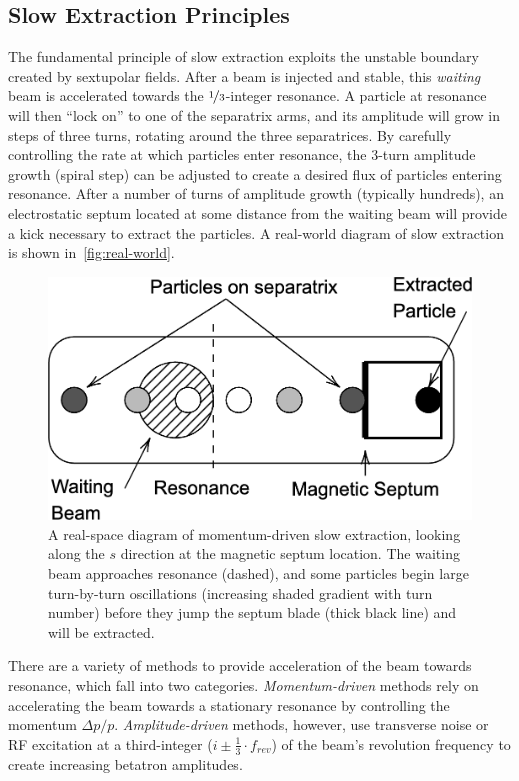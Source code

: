 \documentclass[a4paper,twoside,11pt]{report}
\begin{document}
\subsection{Slow Extraction Principles}
The fundamental principle of slow extraction exploits the unstable boundary created by sextupolar fields. After a beam is injected and stable, this \textit{waiting} beam is accelerated towards the $\nicefrac 13$-integer resonance. A particle at resonance will then ``lock on'' to one of the separatrix arms, and its amplitude will grow in steps of three turns, rotating around the three separatrices. By carefully controlling the rate at which particles enter resonance, the 3-turn amplitude growth (spiral step) can be adjusted to create a desired flux of particles entering resonance. After a number of turns of amplitude growth (typically hundreds), an electrostatic septum located at some distance from the waiting beam will provide a kick necessary to extract the particles. A real-world diagram of slow extraction is shown in~\autoref{fig:real-world}.

\begin{figure}
  \centering
  \includegraphics[width=0.6\linewidth]{real-world.png}
  \caption[Real-space diagram of momentum-driven slow extraction]{A real-space diagram of momentum-driven slow extraction, looking along the $s$ direction at the magnetic septum location. The waiting beam approaches resonance (dashed), and some particles begin large turn-by-turn oscillations (increasing shaded gradient with turn number) before they jump the septum blade (thick black line) and will be extracted.}\label{fig:real-world}
\end{figure}

There are a variety of methods to provide acceleration of the beam towards resonance, which fall into two categories. \textit{Momentum-driven} methods rely on accelerating the beam towards a stationary resonance by controlling the momentum $\Delta p/p$. \textit{Amplitude-driven} methods, however, use transverse noise or RF excitation at a third-integer ($i\pm\frac 13\cdot f_{rev}$) of the beam's revolution frequency to create increasing betatron amplitudes. 
\end{document}

